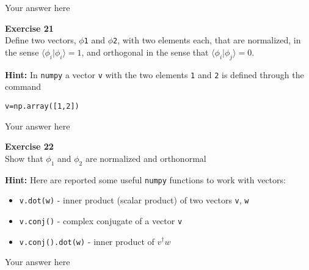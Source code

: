 \documentclass{article}
\begin{document}
Your answer here

\begin{mdframed}
\textbf{Exercise 21}\\
Define two vectors, \texttt{$\phi$1} and \texttt{$\phi$2}, with two elements each, that are normalized, in the sense $\langle\phi_i|\phi_i\rangle=1$, and orthogonal in the sense that $\langle\phi_i|\phi_j\rangle=0$.

\textbf{Hint:} In \texttt{numpy} a vector \texttt{v} with the two elements \texttt{1} and \texttt{2} is defined through the command

\begin{verbatim}
v=np.array([1,2])
\end{verbatim}
\end{mdframed}

Your answer here

\begin{mdframed}
\textbf{Exercise 22}\\
Show that $\phi_1$ and $\phi_2$ are normalized and orthonormal

\textbf{Hint:} Here are reported some useful \texttt{numpy} functions to work with vectors:

\begin{itemize}
\item \texttt{v.dot(w)} - inner product (scalar product) of two vectors \texttt{v}, \texttt{w}
\item \texttt{v.conj()} - complex conjugate of a vector \texttt{v}
\item \texttt{v.conj().dot(w)} - inner product of $v^\dagger w$
\end{itemize}
\end{mdframed}

Your answer here

\end{document}
